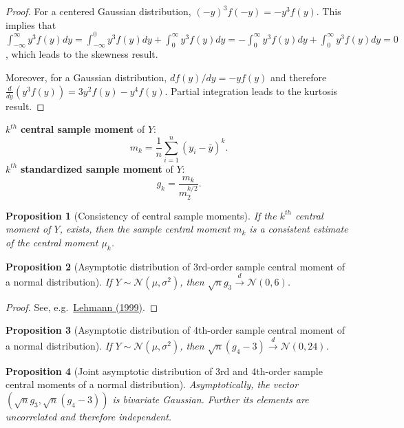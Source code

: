\documentclass[
  12pt,
]{book}
\newtheorem{proposition}{Proposition}[chapter]
\theoremstyle{definition}
\theoremstyle{definition}
\theoremstyle{definition}
\theoremstyle{definition}
\theoremstyle{remark}
\begin{document}
\begin{proof}
For a centered Gaussian distribution, \((-y)^3f(-y)=-y^3f(y)\). This implies that \(\int_{-\infty}^{\infty}y^3f(y)dy=\int_{-\infty}^{0}y^3f(y)dy+\int_{0}^{\infty}y^3f(y)dy=-\int_{0}^{\infty}y^3f(y)dy+\int_{0}^{\infty}y^3f(y)dy=0\), which leads to the skewness result.

Moreover, for a Gaussian distribution, \(df(y)/dy=-yf(y)\) and therefore \(\frac{d}{dy}(y^3f(y))=3y^2f(y)-y^4f(y)\). Partial integration leads to the kurtosis result.
\end{proof}

\(k^{th}\) \textbf{central sample moment} of \(Y\):
\[
    m_k = \frac{1}{n}\sum_{i=1}^n(y_i - \bar{y})^k.
    \]
\(k^{th}\) \textbf{standardized sample moment} of \(Y\):
\[
    g_k = \frac{m_k}{m_2^{k/2}}.
    \]

\begin{proposition}[Consistency of central sample moments]
\protect\hypertarget{prp:conssitCentralMoments}{}\label{prp:conssitCentralMoments}If the \(k^{th}\) central moment of \(Y\), exists, then the sample central moment \(m_k\) is a consistent estimate of the central moment \(\mu_k\).
\end{proposition}

\begin{proposition}[Asymptotic distribution of 3rd-order sample central moment of a normal distribution]
\protect\hypertarget{prp:Asymptg3Normal}{}\label{prp:Asymptg3Normal}If \(Y\sim\mathcal{N}(\mu,\sigma^2)\), then \(\sqrt{n}g_3 \overset{d}{\rightarrow} \mathcal{N}(0,6)\).
\end{proposition}

\begin{proof}
See, e.g.~\href{http://www.springer.com/la/book/9780387985954}{Lehmann (1999)}.
\end{proof}

\begin{proposition}[Asymptotic distribution of 4th-order sample central moment of a normal distribution]
\protect\hypertarget{prp:Asymptg4Normal}{}\label{prp:Asymptg4Normal}If \(Y\sim\mathcal{N}(\mu,\sigma^2)\), then \(\sqrt{n}(g_4-3) \overset{d}{\rightarrow} \mathcal{N}(0,24)\).
\end{proposition}

\begin{proposition}[Joint asymptotic distribution of 3rd and 4th-order sample central moments of a normal distribution]
\protect\hypertarget{prp:Asymptg3g4Normal}{}\label{prp:Asymptg3g4Normal}Asymptotically, the vector \((\sqrt{n}g_3,\sqrt{n}(g_4-3))\) is bivariate Gaussian. Further its elements are uncorrelated and therefore independent.
\end{proposition}
\end{document}
